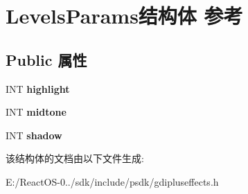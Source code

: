 \hypertarget{struct_levels_params}{}\section{Levels\+Params结构体 参考}
\label{struct_levels_params}
\subsection*{Public 属性}
\begin{DoxyCompactItemize}
\item 
\mbox{\label{struct_levels_params_a6199b6206a2bc60121a5433d32a49e15}} 
I\+NT {\bfseries highlight}
\item 
\mbox{\label{struct_levels_params_a534c5037ed2e6d81d1f7229b0d8d369d}} 
I\+NT {\bfseries midtone}
\item 
\mbox{\label{struct_levels_params_a7d88c1de2ae39d4b13daf14f054e4e69}} 
I\+NT {\bfseries shadow}
\end{DoxyCompactItemize}


该结构体的文档由以下文件生成\+:\begin{DoxyCompactItemize}
\item 
E\+:/\+React\+O\+S-\/0../sdk/include/psdk/gdipluseffects.\+h\end{DoxyCompactItemize}
